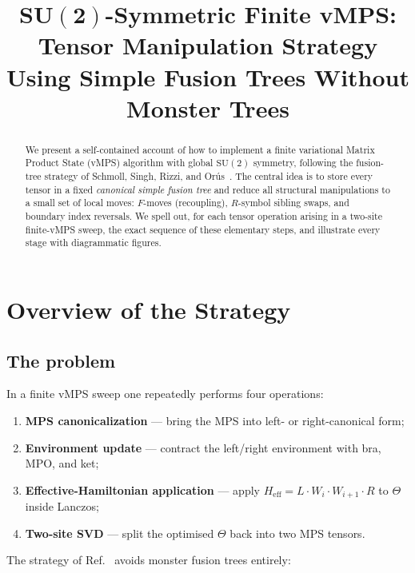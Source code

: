 \documentclass[11pt,a4paper]{article}
\title{\bfseries\sffamily
  $\boldsymbol{SU(2)}$-Symmetric Finite vMPS:\\[4pt]
  Tensor Manipulation Strategy\\[2pt]
  {\large\mdseries Using Simple Fusion Trees Without Monster Trees}}
\author{}
\date{}
\newcommand{\SU}{\mathrm{SU}(2)}
\begin{document}
\maketitle
\thispagestyle{empty}

\begin{abstract}
\noindent
We present a self-contained account of how to implement a finite variational
Matrix Product State (vMPS) algorithm with global $\SU$ symmetry, following
the fusion-tree strategy of Schmoll, Singh, Rizzi, and Or\'us~\cite{SSRO2019}.
The central idea is to store every tensor in a fixed \emph{canonical simple
fusion tree} and reduce all structural manipulations to a small set of local
moves: $F$-moves (recoupling), $R$-symbol sibling swaps, and boundary index
reversals.  We spell out, for each tensor operation arising in a two-site
finite-vMPS sweep, the exact sequence of these elementary steps, and
illustrate every stage with diagrammatic figures.
\end{abstract}

\tableofcontents
\newpage

\section{Overview of the Strategy}
\label{sec:overview}

\subsection{The problem}

In a finite vMPS sweep one repeatedly performs four operations:
\begin{enumerate}[label=(\roman*),nosep]
  \item \textbf{MPS canonicalization} --- bring the MPS into left- or right-canonical form;
  \item \textbf{Environment update} --- contract the left/right environment with bra, MPO, and ket;
  \item \textbf{Effective-Hamiltonian application} --- apply $H_{\mathrm{eff}} = L \cdot W_i \cdot W_{i+1} \cdot R$ to $\Theta$ inside Lanczos;
  \item \textbf{Two-site SVD} --- split the optimised $\Theta$ back into two MPS tensors.
\end{enumerate}

The strategy of Ref.~\cite{SSRO2019} avoids monster fusion trees entirely:
\end{document}
